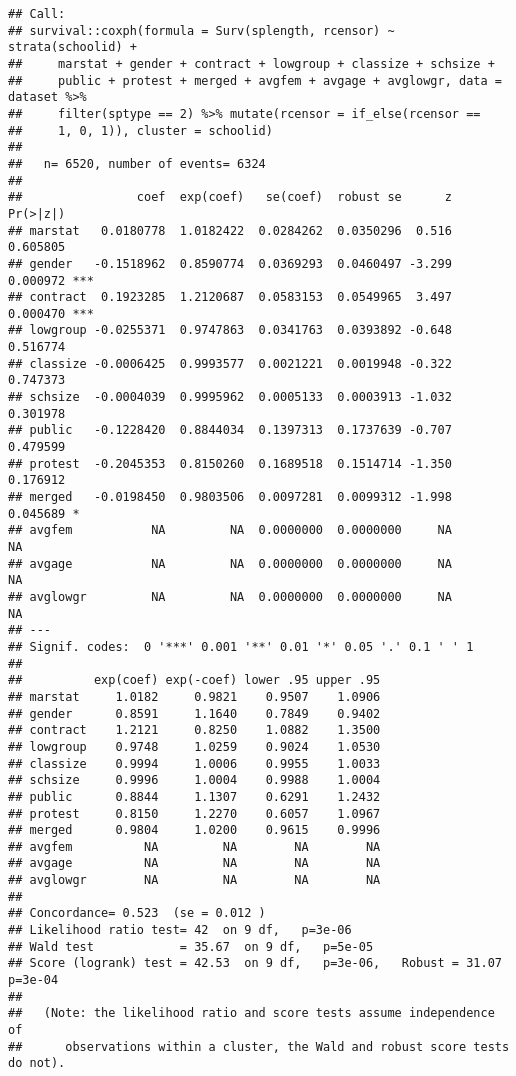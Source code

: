 \documentclass[
]{article}
\begin{document}
\begin{verbatim}
## Call:
## survival::coxph(formula = Surv(splength, rcensor) ~ strata(schoolid) + 
##     marstat + gender + contract + lowgroup + classize + schsize + 
##     public + protest + merged + avgfem + avgage + avglowgr, data = dataset %>% 
##     filter(sptype == 2) %>% mutate(rcensor = if_else(rcensor == 
##     1, 0, 1)), cluster = schoolid)
## 
##   n= 6520, number of events= 6324 
## 
##                coef  exp(coef)   se(coef)  robust se      z Pr(>|z|)    
## marstat   0.0180778  1.0182422  0.0284262  0.0350296  0.516 0.605805    
## gender   -0.1518962  0.8590774  0.0369293  0.0460497 -3.299 0.000972 ***
## contract  0.1923285  1.2120687  0.0583153  0.0549965  3.497 0.000470 ***
## lowgroup -0.0255371  0.9747863  0.0341763  0.0393892 -0.648 0.516774    
## classize -0.0006425  0.9993577  0.0021221  0.0019948 -0.322 0.747373    
## schsize  -0.0004039  0.9995962  0.0005133  0.0003913 -1.032 0.301978    
## public   -0.1228420  0.8844034  0.1397313  0.1737639 -0.707 0.479599    
## protest  -0.2045353  0.8150260  0.1689518  0.1514714 -1.350 0.176912    
## merged   -0.0198450  0.9803506  0.0097281  0.0099312 -1.998 0.045689 *  
## avgfem           NA         NA  0.0000000  0.0000000     NA       NA    
## avgage           NA         NA  0.0000000  0.0000000     NA       NA    
## avglowgr         NA         NA  0.0000000  0.0000000     NA       NA    
## ---
## Signif. codes:  0 '***' 0.001 '**' 0.01 '*' 0.05 '.' 0.1 ' ' 1
## 
##          exp(coef) exp(-coef) lower .95 upper .95
## marstat     1.0182     0.9821    0.9507    1.0906
## gender      0.8591     1.1640    0.7849    0.9402
## contract    1.2121     0.8250    1.0882    1.3500
## lowgroup    0.9748     1.0259    0.9024    1.0530
## classize    0.9994     1.0006    0.9955    1.0033
## schsize     0.9996     1.0004    0.9988    1.0004
## public      0.8844     1.1307    0.6291    1.2432
## protest     0.8150     1.2270    0.6057    1.0967
## merged      0.9804     1.0200    0.9615    0.9996
## avgfem          NA         NA        NA        NA
## avgage          NA         NA        NA        NA
## avglowgr        NA         NA        NA        NA
## 
## Concordance= 0.523  (se = 0.012 )
## Likelihood ratio test= 42  on 9 df,   p=3e-06
## Wald test            = 35.67  on 9 df,   p=5e-05
## Score (logrank) test = 42.53  on 9 df,   p=3e-06,   Robust = 31.07  p=3e-04
## 
##   (Note: the likelihood ratio and score tests assume independence of
##      observations within a cluster, the Wald and robust score tests do not).
\end{verbatim}
\end{document}

